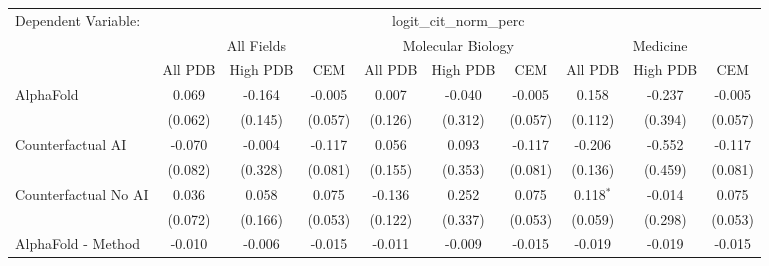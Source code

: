 \begingroup
\centering
\begin{tabular}{lccccccccc}
   \tabularnewline \midrule \midrule
   Dependent Variable: & \multicolumn{9}{c}{logit\_cit\_norm\_perc}\\
 & \multicolumn{3}{c}{All Fields} & \multicolumn{3}{c}{Molecular Biology} & \multicolumn{3}{c}{Medicine} \\
\cmidrule(lr){2-7} \cmidrule(lr){5-10} \cmidrule(lr){8-7}
 & \multicolumn{1}{c}{All PDB} & \multicolumn{1}{c}{High PDB} & \multicolumn{1}{c}{CEM} & \multicolumn{1}{c}{All PDB} & \multicolumn{1}{c}{High PDB} & \multicolumn{1}{c}{CEM} & \multicolumn{1}{c}{All PDB} & \multicolumn{1}{c}{High PDB} & \multicolumn{1}{c}{CEM} \\
\cmidrule(lr){2-3} \cmidrule(lr){3-4} \cmidrule(lr){4-5} \cmidrule(lr){5-6} \cmidrule(lr){6-7} \cmidrule(lr){7-8} \cmidrule(lr){8-9} \cmidrule(lr){9-10} \cmidrule(lr){10-3}
   AlphaFold                                                   & 0.069          & -0.164         & -0.005        & 0.007          & -0.040         & -0.005        & 0.158          & -0.237         & -0.005\\   
                                                               & (0.062)        & (0.145)        & (0.057)       & (0.126)        & (0.312)        & (0.057)       & (0.112)        & (0.394)        & (0.057)\\   
   Counterfactual AI                                           & -0.070         & -0.004         & -0.117        & 0.056          & 0.093          & -0.117        & -0.206         & -0.552         & -0.117\\   
                                                               & (0.082)        & (0.328)        & (0.081)       & (0.155)        & (0.353)        & (0.081)       & (0.136)        & (0.459)        & (0.081)\\   
   Counterfactual No AI                                        & 0.036          & 0.058          & 0.075         & -0.136         & 0.252          & 0.075         & 0.118$^{*}$    & -0.014         & 0.075\\   
                                                               & (0.072)        & (0.166)        & (0.053)       & (0.122)        & (0.337)        & (0.053)       & (0.059)        & (0.298)        & (0.053)\\   
   AlphaFold - Method                                          & -0.010         & -0.006         & -0.015        & -0.011         & -0.009         & -0.015        & -0.019         & -0.019         & -0.015\\   

\end{tabular}
